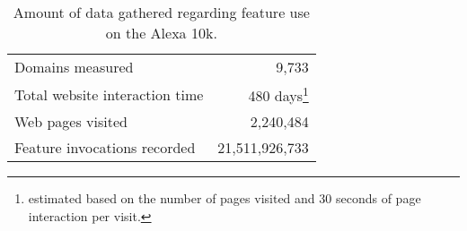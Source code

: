 \begin{table}[ht]
  \centering
  \begin{tabular}{ l r }
    \toprule
      Domains measured                    &  9,733 \\
      Total website interaction time      &  480 days\footnote{estimated based on the number of pages visited and 30 seconds of page interaction per visit.} \\
      Web pages visited                   &  2,240,484    \\
      Feature invocations recorded        &  21,511,926,733 \\
    \bottomrule
  \end{tabular}
  \caption{Amount of data gathered regarding \JS feature use on the Alexa 10k.}
  \label{fig:results-vanity-stats}
\end{table}

